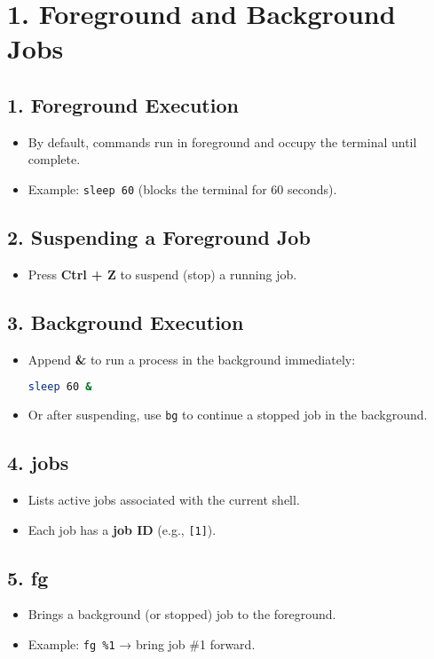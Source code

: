 \documentclass[a4paper]{report}
\begin{document}
\section*{1. Foreground and Background Jobs}

\subsection*{1. Foreground Execution}
\begin{itemize}
    \item By default, commands run in foreground and occupy the terminal until complete.
    \item Example: \texttt{sleep 60} (blocks the terminal for 60 seconds).
\end{itemize}

\subsection*{2. Suspending a Foreground Job}
\begin{itemize}
    \item Press \textbf{Ctrl + Z} to suspend (stop) a running job.
\end{itemize}

\subsection*{3. Background Execution}
\begin{itemize}
    \item Append \textbf{\&} to run a process in the background immediately:
\begin{lstlisting}[language=bash]
sleep 60 &
\end{lstlisting}
    \item Or after suspending, use \texttt{bg} to continue a stopped job in the background.
\end{itemize}

\subsection*{4. jobs}
\begin{itemize}
    \item Lists active jobs associated with the current shell.
    \item Each job has a \textbf{job ID} (e.g., \texttt{[1]}).
\end{itemize}

\subsection*{5. fg}
\begin{itemize}
    \item Brings a background (or stopped) job to the foreground.
    \item Example: \texttt{fg \%1} → bring job \#1 forward.
\end{itemize}
\end{document}
